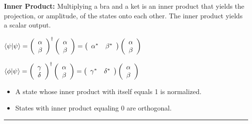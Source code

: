 \documentclass{article}
\begin{document}
\textbf{Inner Product:} Multiplying a bra and a ket is an inner product that yields the projection, or amplitude, of the states onto each other. The inner product yields a scalar output.
\begin{center}
$\langle{\psi} | {\psi}\rangle = \left( 
						\begin{array}{c}
						   {\alpha} \\
						   {\beta}
						\end{array}
					   \right)^\dagger 
					   \left( 
					        \begin{array}{c}
					            {\alpha} \\
						   {\beta}
						\end{array}
				           \right) = \left(\begin{array}{l r} {\alpha}^*  & {\beta}^* \end{array} \right) 
				                        \left(\begin{array}{c c}{\alpha} \\  {\beta}     \end{array}\right)$


$\langle{\phi} | {\psi}\rangle = \left( 
						\begin{array}{c c} 
							{\gamma} \\
							{\delta}
						\end{array}
					    \right)^\dagger 
					    \left( 
					    	\begin{array}{c}
							{\alpha} \\
							{\beta}
						\end{array}
					    \right) = \left( \begin{array}{lr} {\gamma}^* & {\delta}^* \end{array}\right) 
					    \left( \begin{array}{c c}{\alpha} \\ {\beta}\end{array}\right)$

\end{center}

\begin{itemize}
	\item A state whose inner product with itself equals 1 is normalized.
	\item States with inner product equaling 0 are orthogonal.
\end{itemize}

\hrule 
\vspace{5pt}
\end{document}
